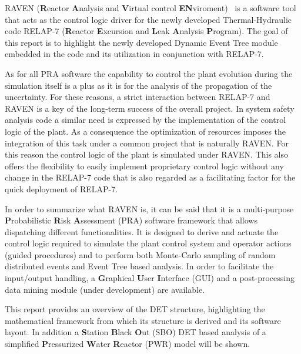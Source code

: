 \label{sec:introduction}
RAVEN (\textbf{R}eactor \textbf{A}nalysis and \textbf{V}irtual control \textbf{EN}viroment)~\cite{ravenFY12,mandelliANS2012} is a software tool that acts as the control logic driver for the newly developed Thermal-Hydraulic code RELAP-7  (\textbf{R}eactor \textbf{E}xcursion and \textbf{L}eak \textbf{A}nalysis \textbf{P}rogram). The goal of this report is to highlight the newly developed  Dynamic Event Tree module embedded in the code and its utilization in conjunction with RELAP-7. 

As for all PRA software the capability to control the plant evolution during the simulation itself is a plus as it is for the analysis of the propagation of the uncertainty. For these reasons, a strict interaction between RELAP-7 and RAVEN is a key of the long-term success of the overall project. In system safety analysis code a similar need is expressed by the implementation of the control logic of the plant. As a consequence the optimization of resources imposes the integration of this task under a common project that is naturally RAVEN. For this reason the control logic of the plant is simulated under RAVEN. This also offers the flexibility to easily implement proprietary control logic  without any change in the RELAP-7 code that is also regarded as a facilitating factor for the quick deployment of RELAP-7.

In order to summarize what RAVEN is, it can be said that it is a multi-purpose \textbf{P}robabilistic \textbf{R}isk \textbf{A}ssessment (PRA) software framework that allows dispatching different functionalities. 
It is designed to derive and actuate the control logic required to simulate the plant control system and operator actions (guided procedures) and to perform both Monte-Carlo sampling of random distributed events and Event Tree based analysis. 
In order to facilitate the input/output handling, a \textbf{G}raphical \textbf{U}ser \textbf{I}nterface (GUI) and a post-processing data mining module (under development) are available.

This report provides an overview of the DET structure, highlighting the mathematical framework from which its structure is derived and its software layout. In addition a \textbf{S}tation \textbf{B}lack \textbf{O}ut (SBO) DET based analysis of a simplified \textbf{P}ressurized \textbf{W}ater \textbf{R}eactor (PWR) model will be shown.
\vspace{-5mm}



